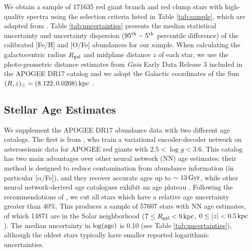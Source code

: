 \documentclass[twocolumn,twocolappendix,linenumbers]{aastex631}
\newcommand{\todo}[1]{{\color{red}#1}}
\newcommand{\kpc}{\,{\rm kpc}}
\newcommand{\Gyr}{\,{\rm Gyr}}
\begin{document}
We obtain a sample of \num{171635} red giant branch and red clump stars with high-quality spectra using the selection criteria listed in Table \ref{tab:sample}, which are adapted from \citet{hayden_chemical_2015}. Table \ref{tab:uncertainties} presents the median statistical uncertainty and uncertainty dispersion ($95^{\rm th} - 5^{\rm th}$ percentile difference) of the calibrated [Fe/H] and [O/Fe] abundances for our sample. When calculating the galactocentric radius $R_{\rm gal}$ and midplane distance $z$ of each star, we use the \citet{bailer-jones_estimating_2021} photo-geometric distance estimates from {\it Gaia} Early Data Release 3 \citep{gaia_collaboration_gaia_2016,gaia_collaboration_gaia_2021} included in the APOGEE DR17 catalog and we adopt the Galactic coordinates of the Sun $(R,z)_\odot=(8.122, 0.0208)\kpc$ \citep{gravity_collaboration_detection_2018,bennett_vertical_2019}. 

\subsection{Stellar Age Estimates}

We supplement the APOGEE DR17 abundance data with two different age catalogs. The first is from \citet{leung_variational_2023}, who train a variational encoder-decoder network on asteroseismic data for APOGEE red giants with $2.5<\log g<3.6$. This catalog has two main advantages over other neural network (NN) age estimates: their method is designed to reduce contamination from abundance information (in particular [$\alpha$/Fe]), and they recover accurate ages up to $\sim13\Gyr$, while other neural network-derived age catalogues exhibit an age plateau \citep[e.g.,][]{mackereth_dynamical_2019}. Following the recommendations of \citet{leung_variational_2023}, we cut all stars which have a relative age uncertainty greater than 40\%. This produces a sample of \num{57607} stars with NN age estimates, of which \num{14871} are in the Solar neighborhood ($7\leq R_{\rm gal}<9\kpc$, $0\leq|z|<0.5\kpc$). The median uncertainty in $\log({\rm age})$ is 0.10 (see Table \ref{tab:uncertainties}), although the oldest stars typically have smaller reported logarithmic uncertainties.
\end{document}
